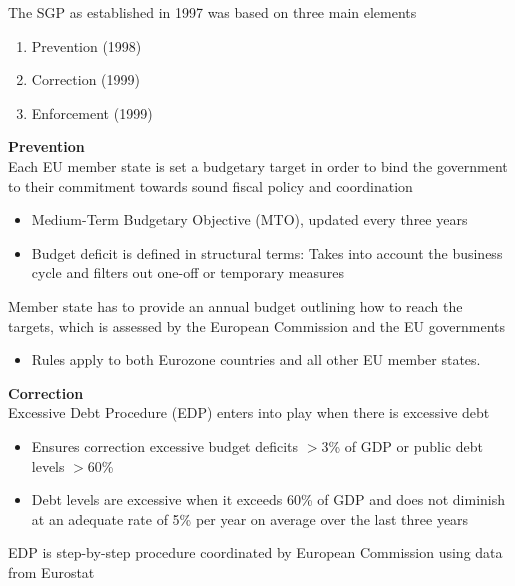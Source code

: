 \documentclass{beamer}
\begin{document}
\begin{frame}
  The SGP as established in 1997 was based on three main elements
\begin{enumerate}
  \item Prevention (1998)
  \item Correction (1999)
  \item Enforcement (1999)
\end{enumerate}
\end{frame}

\begin{frame}
  \textbf{Prevention}\\
    Each EU member state is set a budgetary target in order to bind the government to their commitment towards sound fiscal policy and coordination
    \begin{itemize}
      \item Medium-Term Budgetary Objective (MTO), updated every three years
      \item Budget deficit is defined in structural terms: Takes into account the business cycle and filters out one-off or temporary measures
    \end{itemize}
    Member state has to provide an annual budget outlining how to reach the targets, which is assessed by the European Commission and the EU governments
    \begin{itemize}
      \item Rules apply to both Eurozone countries and all other EU member states.  
    \end{itemize}
\end{frame}

\begin{frame}
  \textbf{Correction}\\
  Excessive Debt Procedure (EDP) enters into play when there is excessive debt 
  \begin{itemize}
    \item Ensures correction excessive budget deficits $>3$\% of GDP or public debt levels $>60$\%
    \item Debt levels are excessive when it exceeds 60\% of GDP and does not diminish at an adequate rate of 5\% per year on average over the last three years
  \end{itemize}
  \medskip
  EDP is step-by-step procedure coordinated by European Commission using data from Eurostat
\end{frame}
\end{document}
